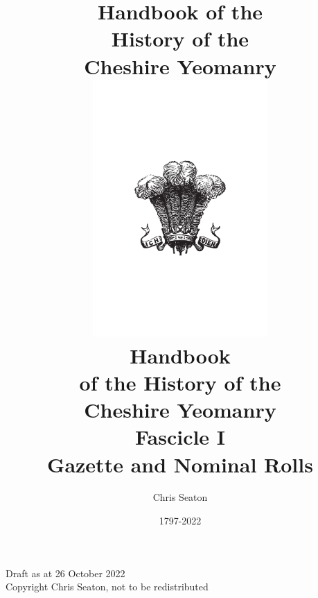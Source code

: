 \documentclass[a4paper,7pt]{book}
\title{Handbook of the \\ History of the \\ Cheshire Yeomanry}
\author{Chris Seaton}
\date{1797-2022}
\title{
  \includegraphics[width=0.5\textwidth]{front/feathers.pdf} \\
  \vspace{10mm}
  \huge Handbook \\
  \vspace{2mm}
  \Large of the History of the \\
  \Huge Cheshire Yeomanry \\
  \vspace{10mm}
  \Large Fascicle I \\ Gazette and Nominal Rolls
}
\begin{document}
\frontmatter

\maketitle

\vspace*{\fill}

\begin{center}
  Draft as at 26 October 2022
  \\ \vspace{10mm}
  Copyright  Chris Seaton, not to be redistributed
\end{center}

\setcounter{tocdepth}{0}
\tableofcontents{}

\mainmatter


% 
% 

%
% 
\end{document}
